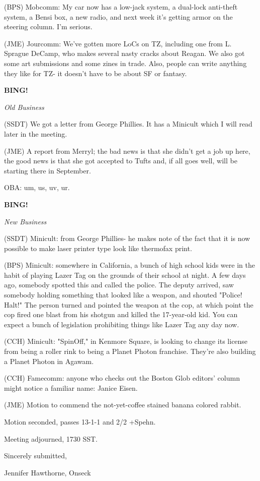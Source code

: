 \documentclass[12pt]{article}
\newcommand{\bing}{{\bf BING!} }
\newcommand{\goto}[1]{\bing \vskip 12pt \centerline{{\em{#1}}}}
\begin{document}
(BPS) Mobcomm: My car now has a low-jack system, a dual-lock anti-theft system, a Bensi box, a new radio, and next week it's getting armor on the steering column. I'm serious.

(JME) Jourcomm: We've gotten more LoCs on TZ, including one from L. Sprague DeCamp, who makes several nasty cracks about Reagan. We also got some art submissions and some zines in trade. Also, people can write anything they like for TZ- it doesn't have to be about SF or fantasy.

\goto{Old Business}

(SSDT) We got a letter from George Phillies. It has a Minicult which I will read later in the meeting.

(JME) A report from Merryl; the bad news is that she didn't get a job up here, the good news is that she got accepted to Tufts and, if all goes well, will be starting there in September.

OBA: um, us, uv, ur.

\goto{New Business}

(SSDT) Minicult: from George Phillies- he makes note of the fact that it is now possible to make laser printer type look like thermofax print.

(BPS) Minicult: somewhere in California, a bunch of high school kids were in the habit of playing Lazer Tag on the grounds of their school at night. A few days ago, somebody spotted this and called the police. The deputy arrived, saw somebody holding something that looked like a weapon, and shouted "Police! Halt!" The person turned and pointed the weapon at the cop, at which point the cop fired one blast from his shotgun and killed the 17-year-old kid. You can expect a bunch of legislation prohibiting things like Lazer Tag any day now.

(CCH) Minicult: "SpinOff," in Kenmore Square, is looking to change its license from being a roller rink to being a Planet Photon franchise. They're also building a Planet Photon in Agawam.

(CCH) Famecomm: anyone who checks out the Boston Glob editors' column might notice a familiar name: Janice Eisen.

(JME) Motion to commend the not-yet-coffee stained banana colored rabbit.

Motion seconded, passes 13-1-1 and 2/2 +Spehn.

\vspace{12pt}

\noindent
Meeting adjourned, 1730 SST.

\vspace{18pt}

\centerline{Sincerely submitted,}
\centerline{Jennifer Hawthorne, Onseck}
\end{document}
